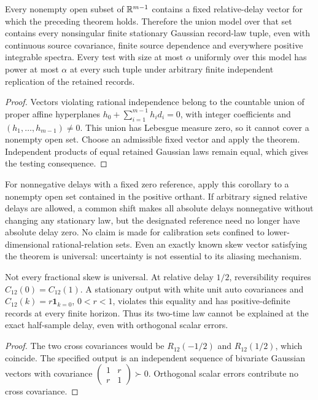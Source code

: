 \begin{corollary}
Every nonempty open subset of $\mathbb R^{m-1}$ contains a fixed relative-delay
vector for which the preceding theorem holds. Therefore the union model
over that set contains every nonsingular finite stationary Gaussian
record-law tuple, even with continuous source covariance, finite source
dependence and everywhere positive integrable spectra. Every test with
size at most $\alpha$ uniformly over this model has power at most
$\alpha$ at every such tuple under arbitrary finite independent
replication of the retained records.
\end{corollary}
\begin{proof}
Vectors violating rational independence belong to the countable union
of proper affine hyperplanes
$h_0+\sum_{i=1}^{m-1}h_i d_i=0$, with integer coefficients and
$(h_1,\ldots,h_{m-1})\ne0$. This union has Lebesgue measure zero,
so it cannot cover a nonempty open set. Choose an admissible fixed
vector and apply the theorem. Independent products of equal retained
Gaussian laws remain equal, which gives the testing consequence.
\end{proof}
For nonnegative delays with a fixed zero reference, apply this corollary
to a nonempty open set contained in the positive orthant. If arbitrary
signed relative delays are allowed, a common shift makes all absolute
delays nonnegative without changing any stationary law, but the designated
reference need no longer have absolute delay zero. No claim is made for
calibration sets confined to lower-dimensional rational-relation sets.
Even an exactly known skew vector satisfying the theorem is universal:
uncertainty is not essential to its aliasing mechanism.

\begin{proposition}
Not every fractional skew is universal. At relative delay $1/2$,
reversibility requires $C_{12}(0)=C_{12}(1)$. A stationary output with
white unit auto covariances and $C_{12}(k)=r\mathbf1_{k=0}$,
$0<r<1$, violates this equality and has positive-definite records at
every finite horizon. Thus its two-time law cannot be explained at the
exact half-sample delay, even with orthogonal scalar errors.
\end{proposition}
\begin{proof}
The two cross covariances would be $R_{12}(-1/2)$ and $R_{12}(1/2)$,
which coincide. The specified output is an independent sequence of bivariate Gaussian vectors with covariance
$\left(\begin{smallmatrix}1&r\\r&1\end{smallmatrix}\right)\succ0$.
Orthogonal scalar errors contribute no cross covariance.
\end{proof}

